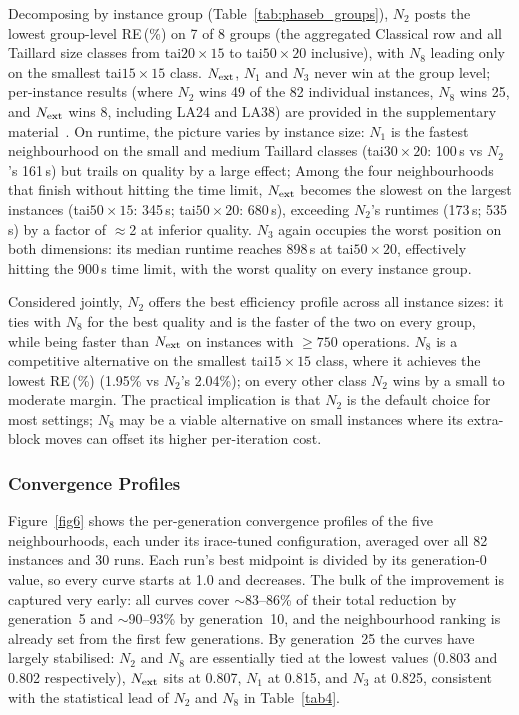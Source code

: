 \documentclass[preprint,12pt]{elsarticle}
\begin{document}
Decomposing by instance group (Table~\ref{tab:phaseb_groups}), $N_2$ posts the lowest group-level RE\,(\%) on 7 of 8 groups (the aggregated Classical row and all Taillard size classes from tai$20{\times}15$ to tai$50{\times}20$ inclusive), with $N_8$ leading only on the smallest tai$15{\times}15$ class. $N_{\rm ext}$, $N_1$ and $N_3$ never win at the group level; per-instance results (where $N_2$ wins 49 of the 82 individual instances, $N_8$ wins 25, and $N_{\rm ext}$ wins 8, including LA24 and LA38) are provided in the supplementary material~\cite{DiazSupp2026}. On runtime, the picture varies by instance size: $N_1$ is the fastest neighbourhood on the small and medium Taillard classes (tai$30{\times}20$: 100\,s vs $N_2$'s 161\,s) but trails on quality by a large effect; Among the four neighbourhoods that finish without hitting the time limit, $N_{\rm ext}$ becomes the slowest on the largest instances (tai$50{\times}15$: 345\,s; tai$50{\times}20$: 680\,s), exceeding $N_2$'s runtimes (173\,s; 535\,s) by a factor of $\approx$2 at inferior quality. $N_3$ again occupies the worst position on both dimensions: its median runtime reaches 898\,s at tai$50{\times}20$, effectively hitting the 900\,s time limit, with the worst quality on every instance group.

Considered jointly, $N_2$ offers the best efficiency profile across all instance sizes: it ties with $N_8$ for the best quality and is the faster of the two on every group, while being faster than $N_{\rm ext}$ on instances with $\geq 750$ operations. $N_8$ is a competitive alternative on the smallest tai$15{\times}15$ class, where it achieves the lowest RE\,(\%) (1.95\% vs $N_2$'s 2.04\%); on every other class $N_2$ wins by a small to moderate margin. The practical implication is that $N_2$ is the default choice for most settings; $N_8$ may be a viable alternative on small instances where its extra-block moves can offset its higher per-iteration cost.

\subsubsection{Convergence Profiles}
\label{sec:convergence}

Figure~\ref{fig6} shows the per-generation convergence profiles of the five neighbourhoods, each under its irace-tuned configuration, averaged over all 82 instances and 30 runs. Each run's best midpoint is divided by its generation-0 value, so every curve starts at 1.0 and decreases. The bulk of the improvement is captured very early: all curves cover $\sim$83--86\% of their total reduction by generation~5 and $\sim$90--93\% by generation~10, and the neighbourhood ranking is already set from the first few generations. By generation~25 the curves have largely stabilised: $N_2$ and $N_8$ are essentially tied at the lowest values (0.803 and 0.802 respectively), $N_{\rm ext}$ sits at 0.807, $N_1$ at 0.815, and $N_3$ at 0.825, consistent with the statistical lead of $N_2$ and $N_8$ in Table~\ref{tab4}.
\end{document}
